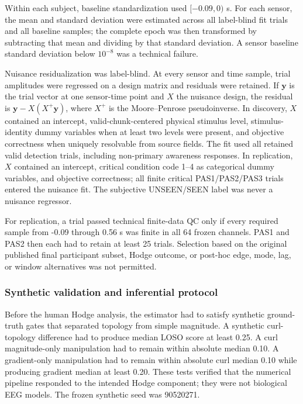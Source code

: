 \documentclass[12pt]{article}
\begin{document}
Within each subject, baseline standardization used $[-0.09,0)$ s. For each sensor, the mean and standard deviation were estimated across all label-blind fit trials and all baseline samples; the complete epoch was then transformed by subtracting that mean and dividing by that standard deviation. A sensor baseline standard deviation below $10^{-8}$ was a technical failure.

Nuisance residualization was label-blind. At every sensor and time sample, trial amplitudes were regressed on a design matrix and residuals were retained. If $\bm y$ is the trial vector at one sensor-time point and $X$ the nuisance design, the residual is $\bm y-X(X^{+}\bm y)$, where $X^{+}$ is the Moore--Penrose pseudoinverse. In discovery, $X$ contained an intercept, valid-chunk-centered physical stimulus level, stimulus-identity dummy variables when at least two levels were present, and objective correctness when uniquely resolvable from source fields. The fit used all retained valid detection trials, including non-primary awareness responses. In replication, $X$ contained an intercept, critical condition code 1--4 as categorical dummy variables, and objective correctness; all finite critical PAS1/PAS2/PAS3 trials entered the nuisance fit. The subjective UNSEEN/SEEN label was never a nuisance regressor.

For replication, a trial passed technical finite-data QC only if every required sample from -0.09 through 0.56 s was finite in all 64 frozen channels. PAS1 and PAS2 then each had to retain at least 25 trials. Selection based on the original published final participant subset, Hodge outcome, or post-hoc edge, mode, lag, or window alternatives was not permitted.

\subsubsection{Synthetic validation and inferential protocol}
Before the human Hodge analysis, the estimator had to satisfy synthetic ground-truth gates that separated topology from simple magnitude. A synthetic curl-topology difference had to produce median LOSO score at least 0.25. A curl magnitude-only manipulation had to remain within absolute median 0.10. A gradient-only manipulation had to remain within absolute curl median 0.10 while producing gradient median at least 0.20. These tests verified that the numerical pipeline responded to the intended Hodge component; they were not biological EEG models. The frozen synthetic seed was 90520271.
\end{document}
